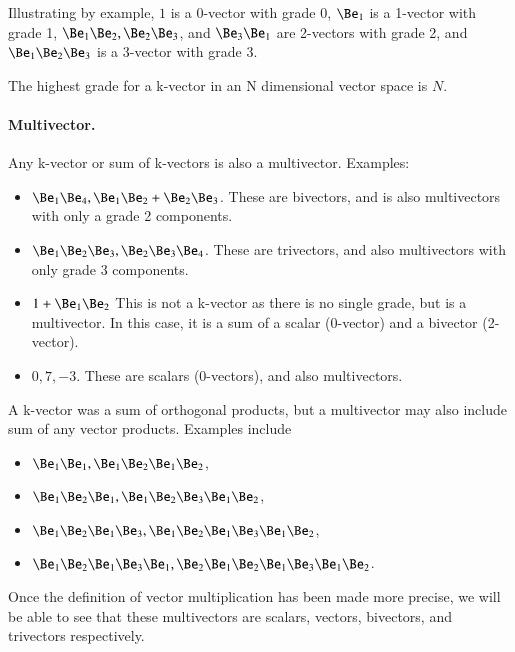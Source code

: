 Illustrating by example, \( 1 \) is a 0-vector with grade 0, \( \Be_1 \) is a 1-vector with grade 1, \( \Be_1 \Be_2, \Be_2 \Be_3 \), and \( \Be_3 \Be_1 \) are 2-vectors with grade 2, and \( \Be_1 \Be_2 \Be_3 \) is a 3-vector with grade 3.

The highest grade for a k-vector in an N dimensional vector space is \( N \).

\paragraph{Multivector.}


Any k-vector or sum of k-vectors is also a multivector.  Examples:
\begin{itemize}
\item
\(\Be_1 \Be_4, \Be_1 \Be_2 + \Be_2 \Be_3\).  These are bivectors, and is also multivectors with only a grade 2 components.
\item
\(\Be_1 \Be_2 \Be_3, \Be_2 \Be_3 \Be_4\).  These are trivectors, and also multivectors with only grade 3 components.
\item
\(1 + \Be_1 \Be_2\)  This is not a k-vector as there is no single grade, but is a multivector.  In this case, it is a sum of a scalar (0-vector) and a bivector (2-vector).
\item
\(0, 7, -3\). These are scalars (0-vectors), and also multivectors.
\end{itemize}
A k-vector was a sum of orthogonal products, but a multivector may also include sum of any vector products.  Examples include
\begin{itemize}
\item
\( \Be_1 \Be_1, \Be_1 \Be_2 \Be_1 \Be_2 \),
\item
\( \Be_1 \Be_2 \Be_1, \Be_1 \Be_2 \Be_3 \Be_1 \Be_2 \),
\item
\( \Be_1 \Be_2 \Be_1 \Be_3, \Be_1 \Be_2 \Be_1 \Be_3 \Be_1 \Be_2 \),
\item
\( \Be_1 \Be_2 \Be_1 \Be_3 \Be_1, \Be_2 \Be_1 \Be_2 \Be_1 \Be_3 \Be_1 \Be_2 \).
\end{itemize}
Once the definition of vector multiplication has been made more precise, we will be able to see that these multivectors are scalars, vectors, bivectors, and trivectors respectively.

